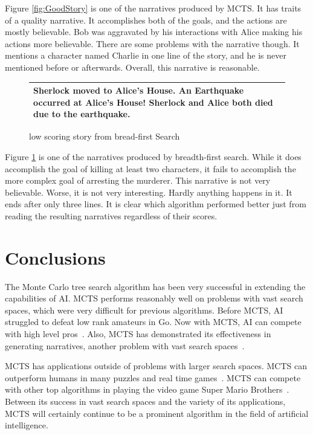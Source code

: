 \documentclass{sig-alternate}
\begin{document}
Figure \ref{fig:GoodStory} is one of the narratives produced by MCTS. It has traits of a quality narrative. It accomplishes both of the goals, and the actions are mostly believable. Bob was aggravated by his interactions with Alice making his actions more believable. There are some problems with the narrative though. It mentions a character named Charlie in one line of the story, and he is never mentioned before or afterwards. Overall, this narrative is reasonable.

\begin{figure}[h]
\begin{tabular}{|p{8cm}|}
\hline
Sherlock moved to Alice's House. An Earthquake occurred at Alice's House! Sherlock and Alice both died due to the earthquake. \\ \hline
\end{tabular}
\centering
\caption{low scoring story from bread-first Search}
\label{fig:BadStory}
\end{figure}

Figure \ref{fig:BadStory} is one of the narratives produced by breadth-first search. While it does accomplish the goal of killing at least two characters, it fails to accomplish the more complex goal of arresting the murderer. This narrative is not very believable. Worse, it is not very interesting. Hardly anything happens in it. It ends after only three lines. It is clear which algorithm performed better just from reading the resulting narratives regardless of their scores.  
\section{Conclusions}
The Monte Carlo tree search algorithm has been very successful in extending the capabilities of AI. MCTS performs reasonably well on problems with vast search spaces, which were very difficult for previous algorithms. Before MCTS, AI struggled to defeat low rank amateurs in Go. Now with MCTS, AI can compete with high level pros~\cite{TheGrandChallenge}. Also, MCTS has demonstrated its effectiveness in generating narratives, another problem with vast search spaces~\cite{Narrative}.

MCTS has applications outside of problems with larger search spaces. MCTS can outperform humans in many puzzles and real time games~\cite{Narrative}. MCTS can compete with other top algorithms in playing the video game Super Mario Brothers~\cite{Jacobsen:2014}. Between its success in vast search spaces and the variety of its applications, MCTS will certainly continue to be a prominent algorithm in the field of artificial intelligence.
\end{document}
